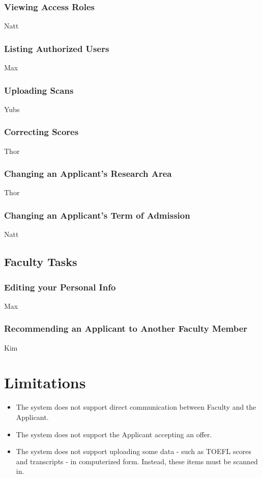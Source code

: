 \documentclass[titlepage]{article}
\begin{document}
\subsubsection{Viewing Access Roles}
Natt
\subsubsection{Listing Authorized Users}
Max
\subsubsection{Uploading Scans}
Yubs
\subsubsection{Correcting Scores}
Thor
\subsubsection{Changing an Applicant's Research Area}
Thor
\subsubsection{Changing an Applicant's Term of Admission}
Natt
\subsection{Faculty Tasks}
\subsubsection{Editing your Personal Info}
Max
\subsubsection{Recommending an Applicant to Another Faculty Member}
Kim


\section{Limitations}
\begin{itemize}
\item The system does not support direct communication between Faculty and the
  Applicant.
\item The system does not support the Applicant accepting an offer.
\item The system does not support uploading some data - such as TOEFL scores
  and transcripts - in computerized form.  Instead, these items must be
  scanned in.
  
\end{itemize}
\end{document}
